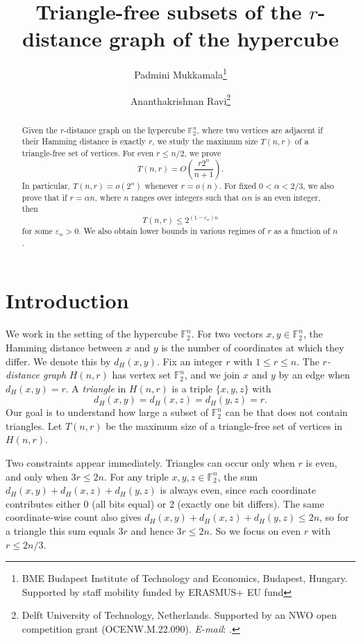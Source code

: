 \documentclass[11pt]{article}
\title{Triangle-free subsets of the $r$-distance graph of the hypercube}
\author{Padmini Mukkamala\thanks{BME Budapest Institute of Technology and Economics, Budapest, Hungary. Supported by staff mobility funded by ERASMUS+ EU fund}
\and
Ananthakrishnan Ravi\thanks{Delft University of Technology, Netherlands. Supported by an NWO open competition
grant (OCENW.M.22.090). \emph{E-mail}: \text{a.ravi@tudelft.nl}.}
}
\date{}
\theoremstyle{plain}
\newcommand{\F}{\mathbb{F}}
\newcommand{\dist}{d_H}
\begin{document}
\maketitle

\begin{abstract}
Given the $r$-distance graph on the hypercube $\F_2^n$, where two vertices are adjacent if their Hamming distance is exactly $r$, we study the maximum size $T(n,r)$ of a triangle-free set of vertices.
For even $r\le n/2$, we prove
\[
T(n,r)=O\!\left(\frac{r2^n}{n+1}\right).
\]
In particular, $T(n,r)=o(2^n)$ whenever $r=o(n)$.
For fixed $0<\alpha<2/3$, we also prove that if $r=\alpha n$, where $n$ ranges over integers such that $\alpha n$ is an even integer, then
\[
T(n,r)\le 2^{(1-\varepsilon_\alpha)n}
\]
for some $\varepsilon_\alpha>0$.
We also obtain lower bounds in various regimes of $r$ as a function of $n$.
\end{abstract}

\section{Introduction}\label{sec:intro}

We work in the setting of the hypercube $\F_2^n$.
For two vectors $x,y \in \F_2^n$, the Hamming distance between $x$ and $y$ is the number of coordinates at which they differ.
We denote this by $\dist(x,y)$. Fix an integer $r$ with $1\le r\le n$.
The \emph{$r$-distance graph} $H(n,r)$ has vertex set $\F_2^n$, and we join $x$ and $y$ by an edge when $\dist(x,y)=r$.
A \emph{triangle} in $H(n,r)$ is a triple $\{x,y,z\}$ with
\[
\dist(x,y)=\dist(x,z)=\dist(y,z)=r.
\]
Our goal is to understand how large a subset of $\F_2^n$ can be that does not contain triangles.
Let $T(n,r)$ be the maximum size of a triangle-free set of vertices in $H(n,r)$.

Two constraints appear immediately.
Triangles can occur only when $r$ is even, and only when $3r\le 2n$.
For any triple $x,y,z\in\F_2^n$, the sum $\dist(x,y)+\dist(x,z)+\dist(y,z)$ is always even, since each coordinate contributes either $0$ (all bits equal) or $2$ (exactly one bit differs).
The same coordinate-wise count also gives $\dist(x,y)+\dist(x,z)+\dist(y,z)\le 2n$, so for a triangle this sum equals $3r$ and hence $3r\le 2n$.
So we focus on even $r$ with $r\le 2n/3$.
\end{document}
